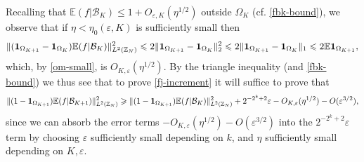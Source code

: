 \documentclass[12pt,a4paper,reqno]{amsart}
\numberwithin{equation}{section}
\theoremstyle{plain}
\theoremstyle{definition}
\renewcommand{\leq}{\leqslant}
\renewcommand{\geq}{\geqslant}
\def\B{{\mathcal B}}
\def\Z{{\mathbb Z}}
\def\E{{\mathbb E}}
\def\eps{{\varepsilon}}
\def\vs{\vspace{11pt}}
\def\ni{\noindent}
\begin{document}
\ni Recalling that $\E(f | \B_K) \leq 1 + O_{\eps,K}(\eta^{1/2})$ outside $\Omega_K$ (cf. \eqref{fbk-bound}), we observe that if $\eta < \eta_0(\eps, K)$ is sufficiently small then
\[ \| ({\bf 1}_{\Omega_{K+1}} - {\bf 1}_{\Omega_K}) \E(f|\B_K) \|_{L^2(\Z_N)}^2 \leq 2 \Vert {\bf 1}_{\Omega_{K+1}} - {\bf 1}_{\Omega_K} \Vert_2^2 \leq 2 \Vert {\bf 1}_{\Omega_{K+1}} - {\bf 1}_{\Omega_K} \Vert_1 \leq 2\E {\bf 1}_{\Omega_{K+1}},\]
which, by \eqref{om-small}, is $O_{K,\eps}(\eta^{1/2})$.
By the triangle inequality (and \eqref{fbk-bound}) we thus see that to prove \eqref{fj-increment} it will suffice
to prove that
\[
 \| (1 - {\bf 1}_{\Omega_{K+1}}) \E(f|\B_{K+1}) \|_{L^2(\Z_N)}^2 \geq \| (1 - {\bf 1}_{\Omega_{K+1}}) \E(f|\B_K) \|_{L^2(\Z_N)}^2 + 
 2^{-2^k + 2} \eps - O_{K,\eps}(\eta^{1/2})
- O(\eps^{3/2}),\]
since we can absorb the error terms $- O_{K,\eps}(\eta^{1/2})
- O(\eps^{3/2})$ into the $2^{-2^k + 2} \eps$ term by choosing $\eps$ sufficiently small depending on $k$, and $\eta$ sufficiently small depending
on $K,\eps$.\vs
\end{document}
